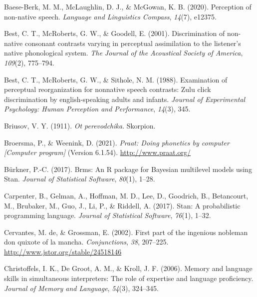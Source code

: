 \documentclass[
]{article}
\newlength{\cslhangindent}
\newenvironment{CSLReferences}[2] %
 {\begin{list}{}{%
  \setlength{\itemindent}{0pt}
  \setlength{\leftmargin}{0pt}
  \setlength{\parsep}{0pt}
  \ifodd #1
   \setlength{\leftmargin}{\cslhangindent}
   \setlength{\itemindent}{-1\cslhangindent}
  \fi
  \setlength{\itemsep}{#2\baselineskip}}}
 {\end{list}}
\begin{document}
\label{refs}
\begin{CSLReferences}{1}{0}
Baese-Berk, M. M., McLaughlin, D. J., \& McGowan, K. B. (2020).
Perception of non-native speech. \emph{Language and Linguistics
Compass}, \emph{14}(7), e12375.

Best, C. T., McRoberts, G. W., \& Goodell, E. (2001). Discrimination of
non-native consonant contrasts varying in perceptual assimilation to the
listener's native phonological system. \emph{The Journal of the
Acoustical Society of America}, \emph{109}(2), 775--794.

Best, C. T., McRoberts, G. W., \& Sithole, N. M. (1988). Examination of
perceptual reorganization for nonnative speech contrasts: Zulu click
discrimination by english-speaking adults and infants. \emph{Journal of
Experimental Psychology: Human Perception and Performance},
\emph{14}(3), 345.

Briusov, V. Y. (1911). \emph{Ot perevodchika}. Skorpion.

Broersma, P., \& Weenink, D. (2021). \emph{Praat: Doing phonetics by
computer {[}{Computer} program{]}} (Version 6.1.54).
\url{http://www.praat.org/}

Bürkner, P.-C. (2017). Brms: {An R} package for {Bayesian} multilevel
models using {Stan}. \emph{Journal of Statistical Software},
\emph{80}(1), 1--28.

Carpenter, B., Gelman, A., Hoffman, M. D., Lee, D., Goodrich, B.,
Betancourt, M., Brubaker, M., Guo, J., Li, P., \& Riddell, A. (2017).
Stan: {A} probabilistic programming language. \emph{Journal of
Statistical Software}, \emph{76}(1), 1--32.

Cervantes, M. de, \& Grossman, E. (2002). First part of the ingenious
nobleman don quixote of la mancha. \emph{Conjunctions}, \emph{38},
207--225. \url{http://www.jstor.org/stable/24518146}

Christoffels, I. K., De Groot, A. M., \& Kroll, J. F. (2006). Memory and
language skills in simultaneous interpreters: {The} role of expertise
and language proficiency. \emph{Journal of Memory and Language},
\emph{54}(3), 324--345.


\end{CSLReferences}
\end{document}
